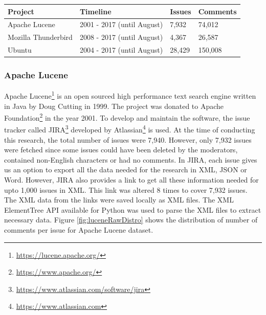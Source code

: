 \documentclass[a4paper,12pt,twoside]{report}
\begin{document}
\begin{table} %
    \centering
    \begin{adjustbox}{max width=\columnwidth}
    \def\arraystretch{1} %
    \begin{tabular}{p{4cm} p{5cm} p{2cm} p{3cm}}
        \toprule
        \textbf{Project} & \textbf{Timeline} & \textbf{Issues} & \textbf{Comments}\\
        \midrule
			Apache Lucene & 2001 - 2017 (until August) & 7,932 & 74,012\\
			Mozilla Thunderbird & 2008 - 2017 (until August) & 4,367 & 26,587\\ 
			Ubuntu & 2004 - 2017 (until August) & 28,429 & 150,008\\
        \midrule
    \end{tabular}
    \end{adjustbox}
    \label{tab:rawIssueTrackers}
\end{table}

\subsubsection{Apache Lucene}
Apache Lucene\footnote{\url{https://lucene.apache.org/}} is an open sourced high performance text search engine written in Java by Doug Cutting in 1999. The project was donated to Apache Foundation\footnote{\url{https://www.apache.org/}} in the year 2001. To develop and maintain the software, the issue tracker called JIRA\footnote{\url{https://www.atlassian.com/software/jira}} developed by Atlassian\footnote{\url{https://www.atlassian.com}} is used. At the time of conducting this research, the total number of issues were 7,940. However, only 7,932 issues were fetched since some issues could have been deleted by the moderators, contained non-English characters or had no comments.
\newline \newline
In JIRA, each issue gives us an option to export all the data needed for the research in XML, JSON or Word. However, JIRA also provides a link to get all these information needed for upto 1,000 issues in XML. This link was altered 8 times to cover 7,932 issues. The XML data from the links were saved locally as XML files. The XML ElementTree API available for Python was used to parse the XML files to extract necessary data. Figure \ref{fig:luceneRawDistro} shows the distribution of number of comments per issue for Apache Lucene dataset. 
\end{document}
